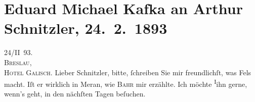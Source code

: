 

         
         \renewcommand{\erwaehntePersonen}{Personen: Hermann Bahr, Friedrich Michael Fels, Adalbert von Goldschmidt, Hugo von Hofmannsthal, Felix Hollaender, Josef Jarno, Arthur Levysohn, Gilbert Otto Neumann-Hofer, Emanuel Reicher, Rudolf Rittner}
         \renewcommand{\erwaehnteInstitutionen}{Institutionen: Berliner Tageblatt, Literarisches Bureau Clemens Freyer, Magazin für die Literatur des Auslandes}
         \renewcommand{\erwaehnteOrte}{Orte: Berlin, Breslau, Hamburg, Hotel Galisch, Meran, München, Schillingstraße, Szklarska Poręba, Wien, Wilhelmstraße}
         \renewcommand{\erwaehnteWerke}{Werke: Anatol, Der Talisman. Dramatisches Märchen, Die Frage an das Schicksal, Familie, Gaea. Musikdrama, Sterben. Novelle}
               \section[Eduard Michael Kafka an Arthur Schnitzler, 24. 2. 1893]{ Eduard Michael Kafka an Arthur Schnitzler, 24. 2. 1893}\nopagebreak{}\rehead{ }\begin{ledgroupsized}[t]{13cm}\normalsize\beginnumbering \toendnotes[C]{\smallbreak\pagebreak[2]} 
\toendnotes[C]{\smallbreak}\pstart
           \raggedleft{}{\pb}24/II 93.{\\}\textsc{Breslau},{\\}\textsc{Hotel Galisch}.\pend
           \pstart{}Lieber Schnitzler,\pend\pstart
           bitte, ſchreiben Sie mir freundlichſt, was Fels
               macht. Iſt er wirklich in Meran, wie \textsc{Bahr} mir erzählte. Ich möchte \substVorne{}\textsuperscript{I}\substDazwischen{}i\substHinten{}hn gerne, wenn’s geht, in den nächſten Tagen beſuchen.\pend
           \pstart

\end{ledgroupsized}
